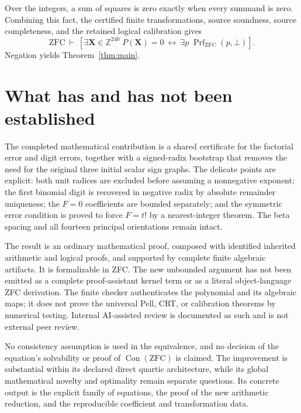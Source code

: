 \documentclass[11pt]{article}
\theoremstyle{definition}\newtheorem{definition}[theorem]{Definition}
\newcommand{\MainVars}{240}
\begin{document}
Over the integers, a sum of squares is zero exactly when every
summand is zero. Combining this fact, the certified finite
transformations, source soundness, source completeness, and the
retained logical calibration gives
\[
 \mathrm{ZFC}\ \vdash\
 \left[
   \exists\mathbf X\in\mathbb Z^{\MainVars}\;P(\mathbf X)=0
   \ \longleftrightarrow\
   \exists p\;\operatorname{Prf}_{\mathrm{ZFC}}(p,\bot)
 \right].
\]
Negation yields Theorem~\ref{thm:main}.

\section{What has and has not been established}

The completed mathematical contribution is a shared certificate for
the factorial error and digit errors, together with a signed-radix
bootstrap that removes the need for the original three initial
scalar sign graphs. The delicate points are explicit: both unit
radices are excluded before assuming a nonnegative exponent;
the first binomial digit is recovered in negative radix by absolute
remainder uniqueness; the \(F=0\) coefficients are bounded separately;
and the symmetric error condition is proved to force \(F=t!\)
by a nearest-integer theorem. The beta spacing and all fourteen
principal orientations remain intact.

The result is an ordinary mathematical proof, composed with identified
inherited arithmetic and logical proofs, and supported by complete
finite algebraic artifacts. It is formalizable in ZFC. The new
unbounded argument has not been emitted as a complete proof-assistant
kernel term or as a literal object-language ZFC derivation.
The finite checker authenticates the polynomial and its algebraic
maps; it does not prove the universal Pell, CRT, or calibration
theorems by numerical testing. Internal AI-assisted review is
documented as such and is not external peer review.

No consistency assumption is used in the equivalence, and no decision
of the equation's solvability or proof of \(\operatorname{Con}(\mathrm{ZFC})\)
is claimed. The improvement is substantial within its declared
direct quartic architecture, while its global mathematical novelty
and optimality remain separate questions. Its concrete output is
the explicit family of equations, the proof of the new arithmetic
reduction, and the reproducible coefficient and transformation data.
\end{document}
